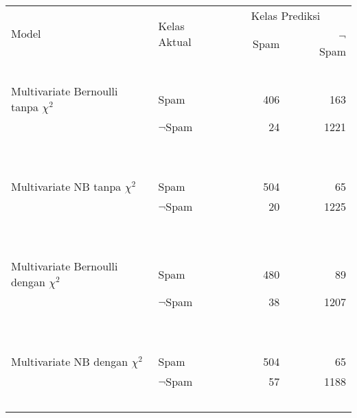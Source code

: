 \label{lamp:confusionmatrix}
\begin{table*}[h!]
	\begin{center}
		\begin{tabular}{l l r r}
			\hline
			\multirow{2}{*}{Model}&\multirow{2}{*}{Kelas Aktual}&\multicolumn{2}{c}{Kelas Prediksi}\\
			\cline{3-4}
			&&~~~~~Spam&~~~~~$\neg$Spam\\
			\hline
			~&~&~&\\
			Multivariate Bernoulli tanpa $\chi^2$&Spam&406&163\\
			&$\neg$Spam&24&1221\\
			~&~&~&\\
			\hline
			~&~&~&\\
			Multivariate NB tanpa $\chi^2$&Spam&504&65\\
			&$\neg$Spam&20&1225\\
			~&~&~&\\
			\hline
			~&~&~&\\
			Multivariate Bernoulli dengan $\chi^2$&Spam&480&89\\
			&$\neg$Spam&38&1207\\
			~&~&~&\\
			\hline
			~&~&~&\\
			Multivariate NB dengan $\chi^2$&Spam&504&65\\
			&$\neg$Spam&57&1188\\
			~&~&~&\\
			\hline	
		\end{tabular}
	\end{center}
\end{table*}
\pagebreak
\label{lamp:kesamaandokumen}

\pagebreak